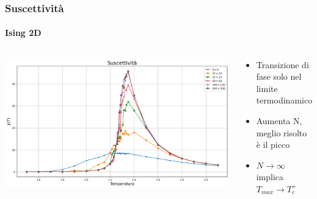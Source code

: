 \begin{frame}
    \frametitle{Suscettività}
    \framesubtitle{Ising 2D}

    \begin{columns}
        \begin{column}{0.6\textwidth}

            \centering
            \includegraphics[width=\textwidth]{Immagini/backupIsing2D/chi.png}

        \end{column}
    
        \begin{column}{0.4\textwidth}

            \begin{itemize}[itemsep=0.5em, label=$\diamond$]
                \item Transizione di fase solo nel limite termodinamico
                \item Aumenta N, meglio risolto è il picco
                \item $N \to \infty$ implica $T_{max} \to T_c^+$
            \end{itemize}
            
        \end{column}
    \end{columns}

\end{frame}



